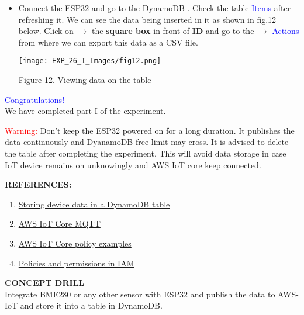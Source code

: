 \documentclass[12pt,a4paper]{article}
\begin{document}
\begin{justify}
\begin{itemize}
\item Connect the ESP32 and go to the DynamoDB . Check the table \textcolor{blue}{Items} after refreshing it. We can see the data being inserted in it as shown in fig.12 below. Click on $ \rightarrow $ the \textbf{square box} in front of \textbf{ID} and go to the $ \rightarrow $ \textcolor{blue}{Actions} from where we can export this data as a CSV file.

\begin{center} 
\texttt{[image: EXP\_26\_I\_Images/fig12.png]}
\end{center}
\vspace{-10mm}
\begin{center} {Figure 12. Viewing data on the table  }\end{center}
\end{itemize}

\begin{center}
\textcolor{blue}{Congratulations!}\\
We have completed part-I of the experiment.
\end{center}

\noindent \textcolor{red}{Warning:} Don't keep the ESP32 powered on for a long duration. It publishes the data continuously and DyanamoDB free limit may cross.  It is advised to delete the table after completing the experiment. This will avoid data storage in case IoT device remains on unknowingly and AWS IoT core keep connected.

\vspace{10pt}
\noindent \textbf{\large REFERENCES:}
\vspace{-6mm}
\begin{enumerate}
\setlength\itemsep{-0.3em}

\item  \href {https://docs.aws.amazon.com/iot/latest/developerguide/iot-ddb-rule.html}{Storing device data in a DynamoDB table}

\item \href{https://aws.amazon.com/about-aws/whats-new/2018/02/aws-iot-core-now-supports-mqtt-connections-with-certificate-based-client-authentication-on-port-443/}{AWS IoT Core MQTT}

\item	\href {https://docs.aws.amazon.com/iot/latest/developerguide/example-iot-policies.html}{AWS IoT Core policy examples}

\item \href {https://docs.aws.amazon.com/IAM/latest/UserGuide/access_policies.html} {Policies and permissions in IAM}

\end{enumerate}


\noindent \textbf{\large CONCEPT DRILL}\\[6pt]
Integrate BME280 or any other sensor with ESP32 and publish the data to AWS-IoT and store it into a table in DynamoDB.

\end{justify}
\end{document}
